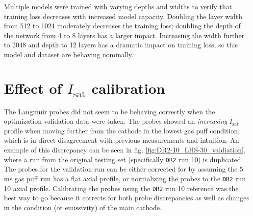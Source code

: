Multiple models were trained with varying depths and widths to verify that training loss decreases with increased model capacity. Doubling the layer width from 512 to 1024 moderately decreases the training loss; doubling the depth of the network from 4 to 8 layers has a larger impact. Increasing the width further to 2048 and depth to 12 layers has a dramatic impact on training loss, so this model and dataset are behaving nominally.



\section{Effect of $I_\text{sat}$ calibration \label{app:calib}}


The Langmuir probes did not seem to be behaving correctly when the optimization validation data were taken. The probes showed an \emph{increasing} $I_\text{sat}$ profile when moving further from the cathode in the lowest gas puff condition, which is in direct disagreement with previous measurements and intuition. An example of this discrepancy can be seen in fig. \ref{fig:DR2-10_LHS-30_valdiation}, where a run from the original testing set (specifically \texttt{DR2} run 10) is duplicated. The probes for the validation run can be either corrected for by assuming the 5 ms gas puff run has a flat axial profile, or normalizing the probes to the \texttt{DR2} run 10 axial profile. Calibrating the probes using the \texttt{DR2} run 10 reference was the best way to go because it corrects for both probe discrepancies as well as changes in the condition (or emissivity) of the main cathode. 